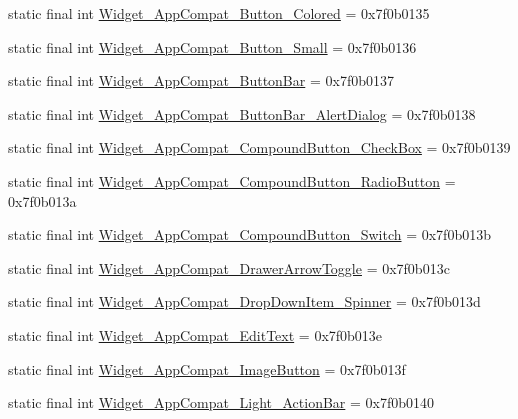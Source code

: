 \begin{CompactItemize}
\item 
static final int \hyperlink{classcom_1_1companyname_1_1x__2doo_1_1_r_1_1style_2e1f6ca5f6213989f2f61b2875dadc61}{Widget\_\-AppCompat\_\-Button\_\-Colored} = 0x7f0b0135
\item 
static final int \hyperlink{classcom_1_1companyname_1_1x__2doo_1_1_r_1_1style_1d9b7648ba28b21590fe4f2a93e7963a}{Widget\_\-AppCompat\_\-Button\_\-Small} = 0x7f0b0136
\item 
static final int \hyperlink{classcom_1_1companyname_1_1x__2doo_1_1_r_1_1style_a228a25fa98926125936fc305d6db4c9}{Widget\_\-AppCompat\_\-ButtonBar} = 0x7f0b0137
\item 
static final int \hyperlink{classcom_1_1companyname_1_1x__2doo_1_1_r_1_1style_47c872b11ea3e68bdde0b3d5c4f54324}{Widget\_\-AppCompat\_\-ButtonBar\_\-AlertDialog} = 0x7f0b0138
\item 
static final int \hyperlink{classcom_1_1companyname_1_1x__2doo_1_1_r_1_1style_3a5aa37af62f7675ac505a7783e45e67}{Widget\_\-AppCompat\_\-CompoundButton\_\-CheckBox} = 0x7f0b0139
\item 
static final int \hyperlink{classcom_1_1companyname_1_1x__2doo_1_1_r_1_1style_6d25444aa311454da1ff144630f49805}{Widget\_\-AppCompat\_\-CompoundButton\_\-RadioButton} = 0x7f0b013a
\item 
static final int \hyperlink{classcom_1_1companyname_1_1x__2doo_1_1_r_1_1style_99860eac3898d101f8825a191688eaf3}{Widget\_\-AppCompat\_\-CompoundButton\_\-Switch} = 0x7f0b013b
\item 
static final int \hyperlink{classcom_1_1companyname_1_1x__2doo_1_1_r_1_1style_b9c2ea841861ad4533d6a10683a80377}{Widget\_\-AppCompat\_\-DrawerArrowToggle} = 0x7f0b013c
\item 
static final int \hyperlink{classcom_1_1companyname_1_1x__2doo_1_1_r_1_1style_c338d0a0a76582d405e33f7f168b9d96}{Widget\_\-AppCompat\_\-DropDownItem\_\-Spinner} = 0x7f0b013d
\item 
static final int \hyperlink{classcom_1_1companyname_1_1x__2doo_1_1_r_1_1style_93cfaf82112b39cf5fac32d36357c43f}{Widget\_\-AppCompat\_\-EditText} = 0x7f0b013e
\item 
static final int \hyperlink{classcom_1_1companyname_1_1x__2doo_1_1_r_1_1style_d844b6aaf58c6dbac55264fe2c138bc2}{Widget\_\-AppCompat\_\-ImageButton} = 0x7f0b013f
\item 
static final int \hyperlink{classcom_1_1companyname_1_1x__2doo_1_1_r_1_1style_0c35cf17ca5ac783b631b0e546daf652}{Widget\_\-AppCompat\_\-Light\_\-ActionBar} = 0x7f0b0140
\item 

\end{CompactItemize}
